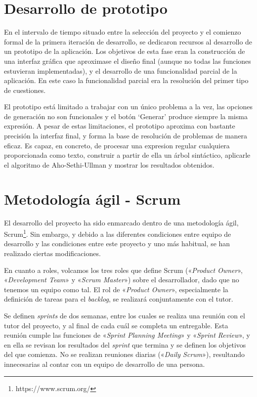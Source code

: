 
\section{Desarrollo de prototipo}
En el intervalo de tiempo situado entre la selección del proyecto y el comienzo formal de la primera iteración de desarrollo, se dedicaron recursos al desarrollo de un prototipo de la aplicación.
Los objetivos de esta fase eran la construcción de una interfaz gráfica que aproximase el diseño final (aunque no todas las funciones estuvieran implementadas), y el desarrollo de una funcionalidad parcial de la aplicación.
En este caso la funcionalidad parcial era la resolución del primer tipo de cuestiones.


El prototipo está limitado a trabajar con un único problema a la vez, las opciones de generación no son funcionales y el botón `Generar' produce siempre la misma expresión.
A pesar de estas limitaciones, el prototipo aproxima con bastante precisión la interfaz final, y forma la base de resolución de problemas de manera eficaz.
Es capaz, en concreto, de procesar una expresion regular cualquiera proporcionada como texto, construir a partir de ella un árbol sintáctico, aplicarle el algoritmo de Aho-Sethi-Ullman y mostrar los resultados obtenidos.

\section{Metodología ágil - Scrum}
El desarrollo del proyecto ha sido enmarcado dentro de una metodología ágil, Scrum\footnote{https://www.scrum.org/}.
Sin embargo, y debido a las diferentes condiciones entre equipo de desarrollo y las condiciones entre este proyecto y uno más habitual, se han realizado ciertas modificaciones.

En cuanto a roles, volcamos los tres roles que define Scrum («\emph{Product Owner}», «\emph{Development Team}» y «\emph{Scrum Master}») sobre el desarrollador, dado que no tenemos un equipo como tal.
El rol de «\emph{Product Owner}», especialmente la definición de tareas para el \emph{backlog}, se realizará conjuntamente con el tutor.

Se definen \emph{sprints} de dos semanas, entre los cuales se realiza una reunión con el tutor del proyecto, y al final de cada cuál se completa un entregable.
Esta reunión cumple las funciones de «\emph{Sprint Planning Meeting}» y «\emph{Sprint Review}», y en ella se revisan los resultados del \emph{sprint} que termina y se definen los objetivos del que comienza.
No se realizan reuniones diarias («\emph{Daily Scrum}»), resultando innecesarias al contar con un equipo de desarrollo de una persona.

